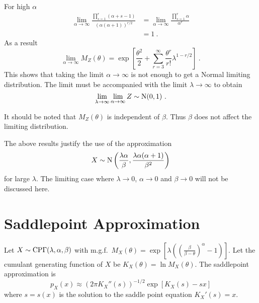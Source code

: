 For high $\alpha$
\begin{align}
  \lim_{\alpha\rightarrow\infty}
  \frac{
    \prod_{s=1}^r(\alpha+s-1)
  }
  {
    (\alpha(\alpha+1))^{r/2}
  }
  &=
  \lim_{\alpha\rightarrow\infty}
  \frac{
    \prod_{s=1}^r\alpha
  }
  {
    \alpha^{r}
  }
  \nonumber\\
  &= 1
  \ .
\end{align}
As a result
\begin{equation}
  \lim_{\alpha\rightarrow\infty}
  M_Z(\theta)=
  \exp\left[
    \frac{\theta^2}{2}
    +\sum_{r=3}^\infty
    \frac{\theta^r}{r!}
    \lambda^{1-r/2}
  \right]
  \ .
\end{equation}
This shows that taking the limit $\alpha\rightarrow\infty$ is not enough to get a Normal limiting distribution. The limit must be accompanied with the limit $\lambda\rightarrow\infty$ to obtain
\begin{equation}
  \lim_{\lambda\rightarrow\infty}\lim_{\alpha\rightarrow\infty}Z\sim\operatorname{N}(0,1)
  \ .
\end{equation}

It should be noted that $M_Z(\theta)$ is independent of $\beta$. Thus $\beta$ does not affect the limiting distribution.

The above results justify the use of the approximation
\begin{equation}
  X\sim\operatorname{N}\left(\frac{\lambda\alpha}{\beta},\frac{\lambda\alpha(\alpha+1)}{\beta^2}\right)
\end{equation}
for large $\lambda$. The limiting case where $\lambda\rightarrow 0$, $\alpha\rightarrow 0$ and $\beta\rightarrow 0$ will not be discussed here.

\section{Saddlepoint Approximation}
\label{chapter:appendix_saddlepoint}
Let $X\sim\operatorname{CP\Gamma}(\lambda,\alpha,\beta)$ with m.g.f.~$M_X(\theta)=\exp\left[\lambda\left(\left(\frac{\beta}{\beta-\theta}\right)^{\alpha}-1\right)\right]$. Let the cumulant generating function of $X$ be $K_X(\theta)=\ln M_X(\theta)$. The saddlepoint approximation is 
\begin{equation}
  p_X(x)\approx\left(2\pi K_X''(s)\right)^{-1/2}\exp\left[K_X(s)-sx\right]
  \label{eq:appendix_saddlepoint}
\end{equation}
where $s=s(x)$ is the solution to the saddle point equation $K_X'(s)=x$.

